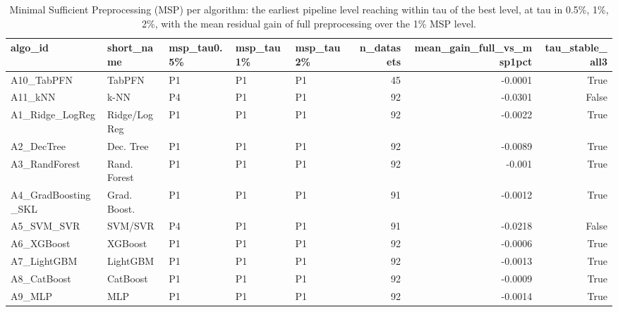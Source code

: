 \begin{table}
\caption{Minimal Sufficient Preprocessing (MSP) per algorithm: the earliest pipeline level reaching within tau of the best level, at tau in {0.5\%, 1\%, 2\%}, with the mean residual gain of full preprocessing over the 1\% MSP level.}
\label{tab:msp}
\begin{tabular}{lllllrrr}
\toprule
algo\_id & short\_name & msp\_tau0.5\% & msp\_tau1\% & msp\_tau2\% & n\_datasets & mean\_gain\_full\_vs\_msp1pct & tau\_stable\_all3 \\
\midrule
A10\_TabPFN & TabPFN & P1 & P1 & P1 & 45 & -0.0001 & True \\
A11\_kNN & k-NN & P4 & P1 & P1 & 92 & -0.0301 & False \\
A1\_Ridge\_LogReg & Ridge/LogReg & P1 & P1 & P1 & 92 & -0.0022 & True \\
A2\_DecTree & Dec. Tree & P1 & P1 & P1 & 92 & -0.0089 & True \\
A3\_RandForest & Rand. Forest & P1 & P1 & P1 & 92 & -0.001 & True \\
A4\_GradBoosting\_SKL & Grad. Boost. & P1 & P1 & P1 & 91 & -0.0012 & True \\
A5\_SVM\_SVR & SVM/SVR & P4 & P1 & P1 & 91 & -0.0218 & False \\
A6\_XGBoost & XGBoost & P1 & P1 & P1 & 92 & -0.0006 & True \\
A7\_LightGBM & LightGBM & P1 & P1 & P1 & 92 & -0.0013 & True \\
A8\_CatBoost & CatBoost & P1 & P1 & P1 & 92 & -0.0009 & True \\
A9\_MLP & MLP & P1 & P1 & P1 & 92 & -0.0014 & True \\
\bottomrule
\end{tabular}
\end{table}

